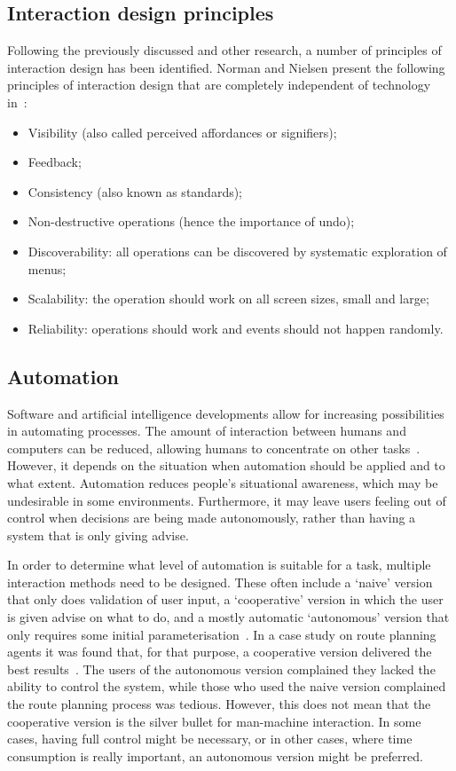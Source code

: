 \subsection[Principles]{Interaction design principles}
Following the previously discussed and other research, a number of principles of interaction design has been identified.
Norman and Nielsen present the following principles of interaction design that are completely independent of technology in~\cite{norman2010gestural}:
\begin{itemize}[noitemsep,topsep=0pt,parsep=0pt,partopsep=0pt]
\item Visibility (also called perceived affordances or signifiers);
\item Feedback;
\item Consistency (also known as standards);
\item Non-destructive operations (hence the importance of undo);
\item Discoverability: all operations can be discovered by systematic exploration of menus;
\item Scalability: the operation should work on all screen sizes, small and large;
\item Reliability: operations should work and events should not happen randomly.
\end{itemize}


\subsection{Automation}
Software and artificial intelligence developments allow for increasing possibilities in automating processes. The amount of interaction between humans and computers can be reduced, allowing humans to concentrate on other tasks~\cite{payne2000varying}. However, it depends on the situation when automation should be applied and to what extent. Automation reduces people's situational awareness, which may be undesirable in some environments. Furthermore, it may leave users feeling out of control when decisions are being made autonomously, rather than having a system that is only giving advise.

In order to determine what level of automation is suitable for a task, multiple interaction methods need to be designed. These often include a `naive' version that only does validation of user input, a `cooperative' version in which the user is given advise on what to do, and a mostly automatic `autonomous' version that only requires some initial parameterisation~\cite{payne2000varying,horvitz1999principles}. In a case study on route planning agents it was found that, for that purpose, a cooperative version delivered the best results~\cite{payne2000varying}. The users of the autonomous version complained they lacked the ability to control the system, while those who used the naive version complained the route planning process was tedious. However, this does not mean that the cooperative version is the silver bullet for man-machine interaction. In some cases, having full control might be necessary, or in other cases, where time consumption is really important, an autonomous version might be preferred.

